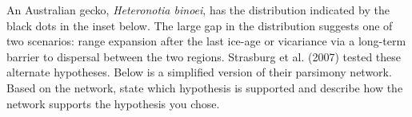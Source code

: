\documentclass[12pt, addpoints]{exam}
\newcommand*\AnswerBox[2]{%
    \parbox[t][#1]{0.92\linewidth}{%
    \begin{solution}#2\end{solution}}
    \vspace*{\stretch{1}}
}
\begin{document}
\begin{questions}
%




%
%
%
%	
%	
%

\newpage

\question[12]
An Australian gecko, \textit{Heteronotia binoei}, has the distribution indicated by the black dots in the inset below.  The large gap in the distribution suggests one of two scenarios: range expansion after the last ice-age or vicariance via a long-term barrier to dispersal between the two regions. Strasburg et al. (2007) tested these alternate hypotheses. Below is a simplified version of their parsimony network.  Based on the network, state which hypothesis is supported and describe how the network supports the hypothesis you chose. 


\end{questions}
\end{document}
